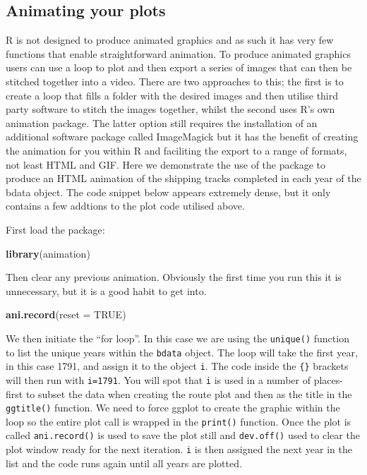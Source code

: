 \documentclass[]{article}
\newenvironment{Shaded}{}{}
\newcommand{\KeywordTok}[1]{\textcolor[rgb]{0.00,0.44,0.13}{\textbf{{#1}}}}
\newcommand{\DataTypeTok}[1]{\textcolor[rgb]{0.56,0.13,0.00}{{#1}}}
\newcommand{\OtherTok}[1]{\textcolor[rgb]{0.00,0.44,0.13}{{#1}}}
\newcommand{\NormalTok}[1]{{#1}}
\begin{document}
\subsection{Animating your plots}

R is not designed to produce animated graphics and as such it has very
few functions that enable straightforward animation. To produce animated
graphics users can use a loop to plot and then export a series of images
that can then be stitched together into a video. There are two
approaches to this; the first is to create a loop that fills a folder
with the desired images and then utilise third party software to stitch
the images together, whilst the second uses R's own animation package.
The latter option still requires the installation of an additional
software package called ImageMagick but it has the benefit of creating
the animation for you within R and faciliting the export to a range of
formats, not least HTML and GIF. Here we demonstrate the use of the
package to produce an HTML animation of the shipping tracks completed in
each year of the bdata object. The code snippet below appears extremely
dense, but it only contains a few addtions to the plot code utilised
above.

First load the package:

\begin{Shaded}
\begin{Highlighting}[]
\KeywordTok{library}\NormalTok{(animation)}
\end{Highlighting}
\end{Shaded}
Then clear any previous animation. Obviously the first time you run this
it is unnecessary, but it is a good habit to get into.

\begin{Shaded}
\begin{Highlighting}[]
\KeywordTok{ani.record}\NormalTok{(}\DataTypeTok{reset =} \OtherTok{TRUE}\NormalTok{)}
\end{Highlighting}
\end{Shaded}
We then initiate the ``for loop''. In this case we are using the
\texttt{unique()} function to list the unique years within the
\texttt{bdata} object. The loop will take the first year, in this case
1791, and assign it to the object \texttt{i}. The code inside the
\texttt{\{\}} brackets will then run with \texttt{i=1791}. You will spot
that \texttt{i} is used in a number of places- first to subset the data
when creating the route plot and then as the title in the
\texttt{ggtitle()} function. We need to force ggplot to create the
graphic within the loop so the entire plot call is wrapped in the
\texttt{print()} function. Once the plot is called \texttt{ani.record()}
is used to save the plot still and \texttt{dev.off()} used to clear the
plot window ready for the next iteration. \texttt{i} is then assigned
the next year in the list and the code runs again until all years are
plotted.
\end{document}
